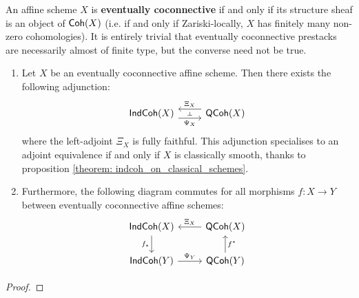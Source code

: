                 \begin{definition} \label{def: eventually_coconnectivity}
                    An affine scheme $X$ is \textbf{eventually coconnective} if and only if its structure sheaf is an object of $\mathsf{Coh}(X)$ (i.e. if and only if Zariski-locally, $X$ has finitely many non-zero cohomologies). It is entirely trivial that eventually coconnective prestacks are necessarily almost of finite type, but the converse need not be true. 
                \end{definition}
                
                \begin{proposition} \label{prop: from_qcoh_to_indcoh}
                    \noindent
                    \begin{enumerate}
                        \item Let $X$ be an eventually coconnective affine scheme. Then there exists the following adjunction:
                            $$
                                \begin{tikzcd}
                                	{\Ind\Coh(X)} & {\QCoh(X)}
                                	\arrow[""{name=0, anchor=center, inner sep=0}, "{\Xi_X}"', shift right=2, from=1-2, to=1-1]
                                	\arrow[""{name=1, anchor=center, inner sep=0}, "{\Psi_X}"', shift right=2, from=1-1, to=1-2]
                                	\arrow["\dashv"{anchor=center, rotate=-90}, draw=none, from=0, to=1]
                                \end{tikzcd}
                            $$
                        where the left-adjoint $\Xi_X$ is fully faithful. This adjunction specialises to an adjoint equivalence if and only if $X$ is classically smooth, thanks to proposition \ref{theorem: indcoh_on_classical_schemes}. 
                        \item Furthermore, the following diagram commutes for all morphisms $f: X \to Y$ between eventually coconnective affine schemes:
                            $$
                                \begin{tikzcd}
                                	{\Ind\Coh(X)} & {\QCoh(X)} \\
                                	{\Ind\Coh(Y)} & {\QCoh(Y)}
                                	\arrow["{\Xi_X}"', from=1-2, to=1-1]
                                	\arrow["{\Psi_Y}", from=2-1, to=2-2]
                                	\arrow["{f^*}"', from=2-2, to=1-2]
                                	\arrow["{f_*}"', from=1-1, to=2-1]
                                \end{tikzcd}
                            $$
                    \end{enumerate}
                \end{proposition}
                    \begin{proof}
                            
                    \end{proof}
                    
